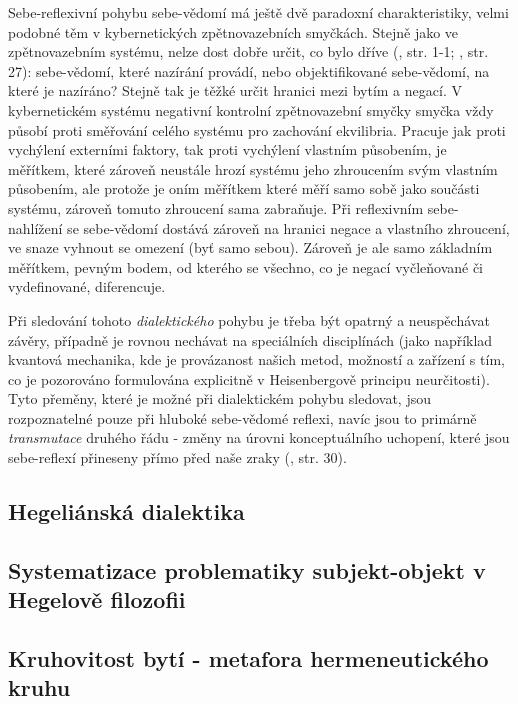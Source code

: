 \documentclass[11pt,a4paper]{article}
\begin{document}
Sebe-reflexivní pohybu sebe-vědomí má ještě dvě paradoxní charakteristiky, velmi podobné těm v kybernetických zpětnovazebních smyčkách. Stejně jako ve zpětnovazebním systému, nelze dost dobře určit, co bylo dříve (\cite{astrom_feedback_2021}, str. 1-1; \cite{kainz_paradox_1988}, str. 27): sebe-vědomí, které nazírání provádí, nebo objektifikované sebe-vědomí, na které je nazíráno? Stejně tak je těžké určit hranici mezi bytím a negací. V kybernetickém systému negativní kontrolní zpětnovazební smyčky smyčka vždy působí proti směřování celého systému pro zachování ekvilibria. Pracuje jak proti vychýlení externími faktory, tak proti vychýlení vlastním působením, je měřítkem, které zároveň neustále hrozí systému jeho zhroucením svým vlastním působením, ale protože je oním měřítkem které měří samo sobě jako součásti systému, zároveň tomuto zhroucení sama zabraňuje. Při reflexivním sebe-nahlížení se sebe-vědomí dostává zároveň na hranici negace a vlastního zhroucení, ve snaze vyhnout se omezení (byť samo sebou). Zároveň je ale samo základním měřítkem, pevným bodem, od kterého se všechno, co je negací vyčleňované či vydefinované, diferencuje. 

Při sledování tohoto \textit{dialektického} pohybu je třeba být opatrný a neuspěchávat závěry, případně je rovnou nechávat na speciálních disciplínách (jako například kvantová mechanika, kde je provázanost našich metod, možností a zařízení s tím, co je pozorováno formulována explicitně v Heisenbergově principu neurčitosti). Tyto přeměny, které je možné při dialektickém pohybu sledovat, jsou rozpoznatelné pouze při hluboké sebe-vědomé reflexi, navíc jsou to primárně \textit{transmutace} druhého řádu - změny na úrovni konceptuálního uchopení, které jsou sebe-reflexí přineseny přímo před naše zraky (\cite{kainz_paradox_1988}, str. 30).


\subsection{Hegeliánská dialektika}





\subsection{Systematizace problematiky subjekt-objekt v Hegelově filozofii}




\subsection{Kruhovitost bytí - metafora hermeneutického kruhu}
\end{document}
